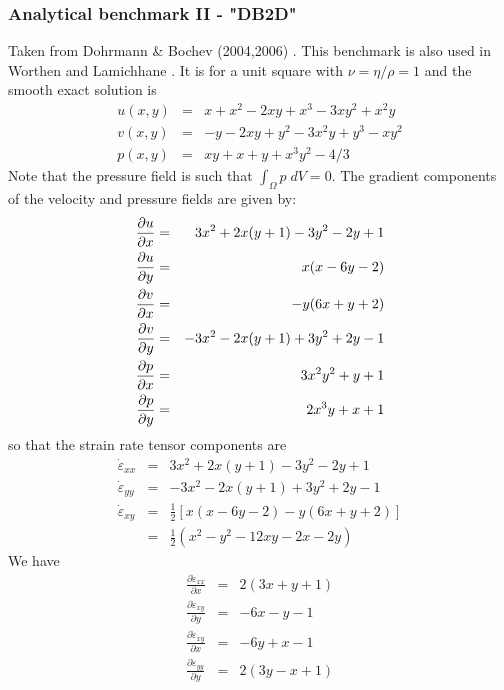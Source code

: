 \subsubsection{Analytical benchmark II \label{ss:mms2} - "DB2D"}

Taken from Dohrmann \& Bochev (2004,2006) \cite{dobo04,bodg06}. 
This benchmark is also used in Worthen \etal \cite{wosp14} and Lamichhane \etal \cite{lami17}.
It is for a unit square with $\nu=\eta/\rho=1$ and the smooth exact solution is
\begin{eqnarray}
u(x,y) &=& x+x^2 - 2xy+x^3 - 3xy^2 + x^2y \\
v(x,y) &=& -y-2xy+y^2 -3x^2y + y^3 - xy^2 \\
p(x,y) &=& xy+x+y+x^3y^2 - 4/3
\end{eqnarray}
Note that the pressure field is such that $\int_{\Omega} p \; dV = 0$.
The gradient components of the velocity and pressure fields are given by:
\begin{eqnarray}
\frac{\partial u}{\partial x} &=& 3x^2+2x(y+1)-3y^2-2y+1  \nonumber \\
\frac{\partial u}{\partial y} &=& x(x-6y-2) \nonumber\\
\frac{\partial v}{\partial x} &=& -y(6x+y+2) \nonumber\\
\frac{\partial v}{\partial y} &=& -3x^2-2x(y+1)+3y^2+2y-1 \nonumber\\
\frac{\partial p}{\partial x} &=& 3x^2y^2 + y +1 \nonumber\\ 
\frac{\partial p}{\partial y} &=& 2x^3y+x+1 \nonumber
\end{eqnarray}
so that the strain rate tensor components are 
\begin{eqnarray}
\dot{\varepsilon}_{xx} &=&  3x^2+2x(y+1)-3y^2-2y+1 \\
\dot{\varepsilon}_{yy} &=& -3x^2-2x(y+1)+3y^2+2y-1 \\
\dot{\varepsilon}_{xy} &=&  \frac{1}{2} [x(x-6y-2) -y(6x+y+2) ] \\
&=& \frac{1}{2}( x^2 -y^2 -12xy -2x -2y)
\end{eqnarray}
We have
\begin{eqnarray}
\frac{\partial \dot{\varepsilon}_{xx}}{\partial x} &=& 2(3x+y+1) \\
\frac{\partial \dot{\varepsilon}_{xy}}{\partial y} &=& -6x-y-1  \\
\frac{\partial \dot{\varepsilon}_{xy}}{\partial x} &=&  -6y+x-1 \\  
\frac{\partial \dot{\varepsilon}_{yy}}{\partial y} &=& 2(3y-x+1) 
\end{eqnarray}
